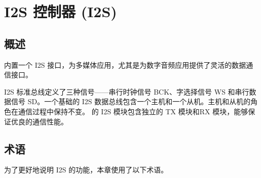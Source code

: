 \documentclass[main\_\_CN.tex]{subfiles}
\begin{document}

\ifglobal
\else
    \listoftodos
    {\let\clearpage\relax \listofdonetodos}
    \tableofcontents
\fi




\hypertarget{i2s}{}
\chapter{I2S 控制器 (I2S)}
\label{mod:i2s}

\section{概述}

\chipname{} 内置一个 I2S 接口，为多媒体应用，尤其是为数字音频应用提供了灵活的数据通信接口。

I2S 标准总线定义了三种信号——串行时钟信号 BCK、字选择信号 WS 和串行数据信号 SD。一个基础的 I2S 数据总线包含一个主机和一个从机。主机和从机的角色在通信过程中保持不变。\chipname{} 的 I2S 模块包含独立的 TX 模块和RX 模块，能够保证优良的通信性能。

\section{术语}

为了更好地说明 I2S 的功能，本章使用了以下术语。 
\end{document}
